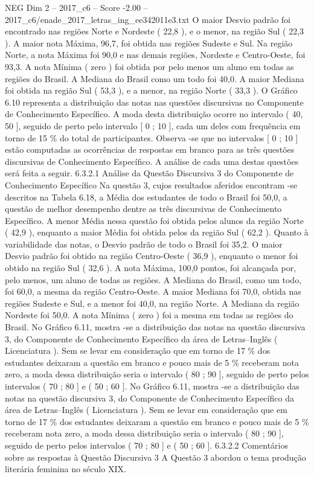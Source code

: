 \begin{textsample}{NEG Dim 2 – 2017\_c6 – Score -2.00 – 2017\_c6/enade\_2017\_letras\_ing\_ee342011e3.txt}
O maior Desvio padrão foi encontrado nas regiões Norte e Nordeste ( 22,8 ), e o menor, na região Sul ( 22,3 ).
A maior nota Máxima, 96,7, foi obtida nas regiões Sudeste e Sul.
Na região Norte, a nota Máxima foi 90,0 e nas demais regiões, Nordeste e Centro-Oeste, foi 93,3.
A nota Mínima ( zero ) foi obtida por pelo menos um aluno em todas as regiões do Brasil.
A Mediana do Brasil como um todo foi 40,0.
A maior Mediana foi obtida na região Sul ( 53,3 ), e a menor, na região Norte ( 33,3 ).
O Gráfico 6.10 representa a distribuição das notas nas questões discursivas no Componente de Conhecimento Específico.
A moda desta distribuição ocorre no intervalo ( 40, 50 ], seguido de perto pelo intervalo [ 0 ; 10 ], cada um deles com frequência em torno de 15 \% do total de participantes.
Observa -se que no intervalos [ 0 ; 10 ] estão computadas as ocorrências de respostas em branco para as três questões discursivas de Conhecimento Específico.
A análise de cada uma destas questões será feita a seguir. 6.3.2.1 Análise da Questão Discursiva 3 do Componente de Conhecimento Específico Na questão 3, cujos resultados aferidos encontram -se descritos na Tabela 6.18, a Média dos estudantes de todo o Brasil foi 50,0, a questão de melhor desempenho dentre as três discursivas de Conhecimento Específico.
A menor Média nessa questão foi obtida pelos alunos da região Norte ( 42,9 ), enquanto a maior Média foi obtida pelos da região Sul ( 62,2 ).
Quanto à variabilidade das notas, o Desvio padrão de todo o Brasil foi 35,2.
O maior Desvio padrão foi obtido na região Centro-Oeste ( 36,9 ), enquanto o menor foi obtido na região Sul ( 32,6 ).
A nota Máxima, 100,0 pontos, foi alcançada por, pelo menos, um aluno de todas as regiões.
A Mediana do Brasil, como um todo, foi 60,0, a mesma da região Centro-Oeste.
A maior Mediana foi 70,0, obtida nas regiões Sudeste e Sul, e a menor foi 40,0, na região Norte.
A Mediana da região Nordeste foi 50,0.
A nota Mínima ( zero ) foi a mesma em todas as regiões do Brasil.
No Gráfico 6.11, mostra -se a distribuição das notas na questão discursiva 3, do Componente de Conhecimento Específico da área de Letras–Inglês ( Licenciatura ).
Sem se levar em consideração que em torno de 17 \% dos estudantes deixaram a questão em branco e pouco mais de 5 \% receberam nota zero, a moda dessa distribuição seria o intervalo ( 80 ; 90 ], seguido de perto pelos intervalos ( 70 ; 80 ] e ( 50 ; 60 ].
No Gráfico 6.11, mostra -se a distribuição das notas na questão discursiva 3, do Componente de Conhecimento Específico da área de Letras–Inglês ( Licenciatura ).
Sem se levar em consideração que em torno de 17 \% dos estudantes deixaram a questão em branco e pouco mais de 5 \% receberam nota zero, a moda dessa distribuição seria o intervalo ( 80 ; 90 ], seguido de perto pelos intervalos ( 70 ; 80 ] e ( 50 ; 60 ]. 6.3.2.2 Comentários sobre as respostas à Questão Discursiva 3 A Questão 3 abordou o tema produção literária feminina no século XIX.

\end{textsample}
